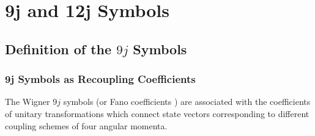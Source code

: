 \chapter{9j and 12j Symbols}\label{chap:10}
\section{Definition of the $9 j$ Symbols}\label{sec:10.1}
\subsection{9j Symbols as Recoupling Coefficients}\label{sec:10.1.1}
The Wigner $9 j$ symbols \cite{ref110} (or Fano coefficients \cite{ref066}) are associated with the coefficients of unitary transformations which connect state vectors corresponding to different coupling schemes of four angular momenta.


